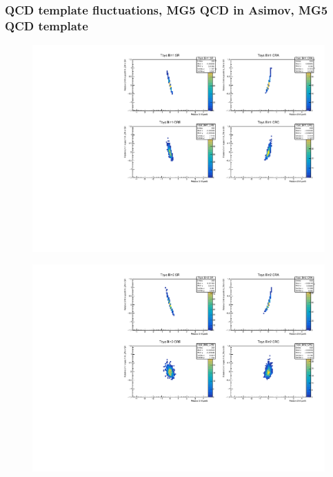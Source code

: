 \subsubsection{\mjj QCD template fluctuations, MG5 QCD in Asimov, MG5 QCD template}
\begin{figure}[H]
\includegraphics[width=\textwidth]{plots/diffx/instab/constfx/instabilities_mjj_QCD_Mgraph_Signal_Sh2211_BSMCQCDSTATS_madgraphasimov_bin1.pdf}
\end{figure}
\begin{figure}[H]
\includegraphics[width=\textwidth]{plots/diffx/instab/constfx/instabilities_mjj_QCD_Mgraph_Signal_Sh2211_BSMCQCDSTATS_madgraphasimov_bin2.pdf}
\end{figure}
